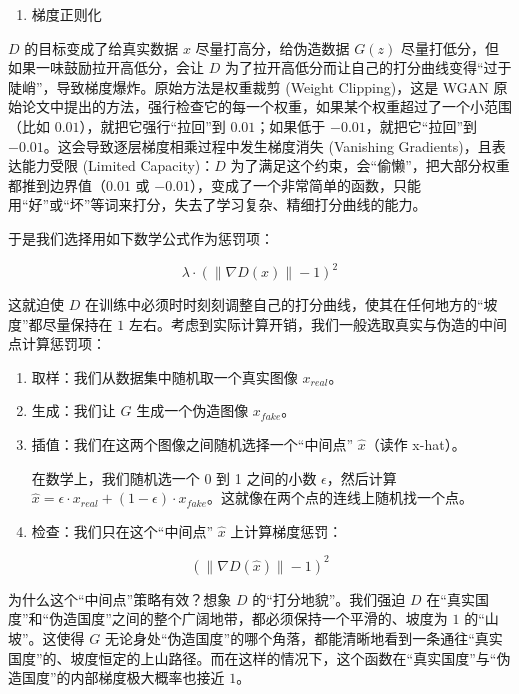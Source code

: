 \begin{enumerate}
\def\labelenumi{\arabic{enumi}.}
\setcounter{enumi}{1}
\tightlist
\item
  梯度正则化
\end{enumerate}

\(D\) 的目标变成了给真实数据 \(x\) 尽量打高分，给伪造数据 \(G(z)\) 尽量打低分，但如果一味鼓励拉开高低分，会让 \(D\) 为了拉开高低分而让自己的打分曲线变得``过于陡峭''，导致梯度爆炸。原始方法是权重裁剪 (Weight Clipping)，这是 WGAN 原始论文中提出的方法，强行检查它的每一个权重，如果某个权重超过了一个小范围（比如 \(0.01\)），就把它强行``拉回''到 \(0.01\)；如果低于 \(-0.01\)，就把它``拉回''到 \(-0.01\)。这会导致逐层梯度相乘过程中发生梯度消失 (Vanishing Gradients)，且表达能力受限 (Limited Capacity)：\(D\) 为了满足这个约束，会``偷懒''，把大部分权重都推到边界值（\(0.01\) 或 \(-0.01\)），变成了一个非常简单的函数，只能用``好''或``坏''等词来打分，失去了学习复杂、精细打分曲线的能力。

于是我们选择用如下数学公式作为惩罚项：

\[
\lambda \cdot (\lVert \nabla D(x) \rVert - 1)^2
\]

这就迫使 \(D\) 在训练中必须时时刻刻调整自己的打分曲线，使其在任何地方的``坡度''都尽量保持在 \(1\) 左右。考虑到实际计算开销，我们一般选取真实与伪造的中间点计算惩罚项：

\begin{enumerate}
\def\labelenumi{\arabic{enumi}.}
\item
  取样：我们从数据集中随机取一个真实图像 \(x_{real}\)。
\item
  生成：我们让 \(G\) 生成一个伪造图像 \(x_{fake}\)。
\item
  插值：我们在这两个图像之间随机选择一个``中间点'' \(\hat{x}\)（读作 x-hat）。

  在数学上，我们随机选一个 0 到 1 之间的小数 \(\epsilon\)，然后计算 \(\hat{x}=\epsilon\cdot x_{real}+(1-\epsilon)\cdot x_{fake}\)。这就像在两个点的连线上随机找一个点。
\item
  检查：我们只在这个``中间点'' \(\hat{x}\) 上计算梯度惩罚：
\end{enumerate}

\[
(\lVert \nabla D(\hat{x}) \rVert - 1)^2
\]

为什么这个``中间点''策略有效？想象 \(D\) 的``打分地貌''。我们强迫 \(D\) 在``真实国度''和``伪造国度''之间的整个广阔地带，都必须保持一个平滑的、坡度为 \(1\) 的``山坡''。这使得 \(G\) 无论身处``伪造国度''的哪个角落，都能清晰地看到一条通往``真实国度''的、坡度恒定的上山路径。而在这样的情况下，这个函数在``真实国度''与``伪造国度''的内部梯度极大概率也接近 \(1\)。

